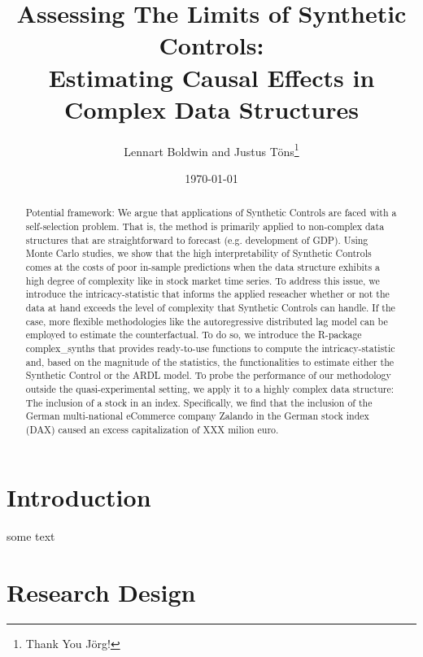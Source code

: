 \documentclass[AER]{AEA}
\begin{document}
	
	\title{Assessing The Limits of Synthetic Controls: \\ Estimating Causal Effects in Complex Data Structures}
	\shortTitle{}
	\author{Lennart Boldwin and Justus Töns\thanks{Thank You Jörg!}}
	\date{\today}
	\JEL{}
	\Keywords{}
	
	\begin{abstract}
		Potential framework: We argue that applications of Synthetic Controls are faced with a self-selection problem. That is, the method is primarily applied to non-complex data structures that are straightforward to forecast (e.g. development of GDP). Using Monte Carlo studies, we show that the high interpretability of Synthetic Controls comes at the costs of poor in-sample predictions when the data structure exhibits a high degree of complexity like in stock market time series. To address this issue, we introduce the intricacy-statistic that informs the applied reseacher whether or not the data at hand exceeds the level of complexity that Synthetic Controls can handle. If the case, more flexible methodologies like the autoregressive distributed lag model can be employed to estimate the counterfactual. To do so, we introduce the R-package complex\_synths that provides ready-to-use functions to compute the intricacy-statistic and, based on the magnitude of the statistics, the functionalities to estimate either the Synthetic Control or the ARDL model. To probe the performance of our methodology outside the quasi-experimental setting, we apply it to a highly complex data structure: The inclusion of a stock in an index. Specifically, we find that the inclusion of the German multi-national eCommerce company Zalando in the German stock index (DAX) caused an excess capitalization of XXX milion euro. 
	\end{abstract}
	
	
	\maketitle
	
	\section{Introduction}
	
	some text
	
	\section{Research Design}
	
\end{document}
